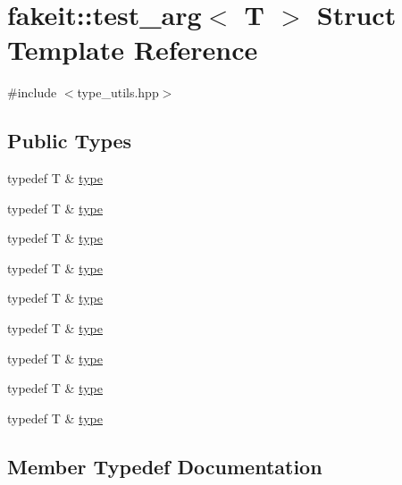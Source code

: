 \hypertarget{structfakeit_1_1test__arg}{}\section{fakeit\+::test\+\_\+arg$<$ T $>$ Struct Template Reference}
\label{structfakeit_1_1test__arg}


{\ttfamily \#include $<$type\+\_\+utils.\+hpp$>$}

\subsection*{Public Types}
\begin{DoxyCompactItemize}
\item 
typedef T \& \mbox{\hyperlink{structfakeit_1_1test__arg_a100a8f745c77f37aad942184679a0399}{type}}
\item 
typedef T \& \mbox{\hyperlink{structfakeit_1_1test__arg_a100a8f745c77f37aad942184679a0399}{type}}
\item 
typedef T \& \mbox{\hyperlink{structfakeit_1_1test__arg_a100a8f745c77f37aad942184679a0399}{type}}
\item 
typedef T \& \mbox{\hyperlink{structfakeit_1_1test__arg_a100a8f745c77f37aad942184679a0399}{type}}
\item 
typedef T \& \mbox{\hyperlink{structfakeit_1_1test__arg_a100a8f745c77f37aad942184679a0399}{type}}
\item 
typedef T \& \mbox{\hyperlink{structfakeit_1_1test__arg_a100a8f745c77f37aad942184679a0399}{type}}
\item 
typedef T \& \mbox{\hyperlink{structfakeit_1_1test__arg_a100a8f745c77f37aad942184679a0399}{type}}
\item 
typedef T \& \mbox{\hyperlink{structfakeit_1_1test__arg_a100a8f745c77f37aad942184679a0399}{type}}
\item 
typedef T \& \mbox{\hyperlink{structfakeit_1_1test__arg_a100a8f745c77f37aad942184679a0399}{type}}
\end{DoxyCompactItemize}


\subsection{Member Typedef Documentation}
\mbox{\label{structfakeit_1_1test__arg_a100a8f745c77f37aad942184679a0399}} 
